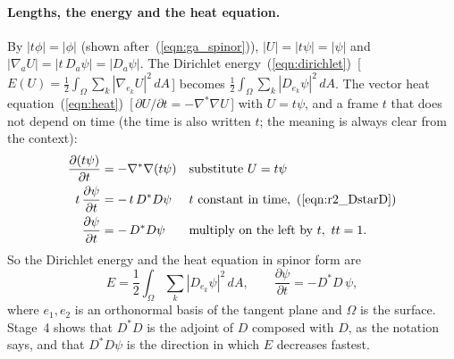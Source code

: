 \paragraph{Lengths, the energy and the heat equation.} By $|t\phi| = |\phi|$ (shown after~(\ref{eqn:ga_spinor})), $|U| = |t\psi| = |\psi|$ and $|\nabla_a U| = |t\, D_a\psi| = |D_a \psi|$. The Dirichlet energy~(\ref{eqn:dirichlet})~[\,$E(U) = \frac12\int_\Omega\sum_k|\nabla_{e_k}U|^2\,dA$\,] becomes $\frac12\int_\Omega\sum_k |D_{e_k}\psi|^2\, dA$. The vector heat equation~(\ref{eqn:heat})~[\,$\partial U/\partial t = -\nabla^*\nabla U$\,] with $U = t\psi$, and a frame $t$ that does not depend on time (the time is also written $t$; the meaning is always clear from the context):
\begin{align*}
\frac{\partial (t\psi)}{\partial t} &= -\nabla^*\nabla(t\psi) && \text{substitute } U = t\psi \\
t\,\frac{\partial\psi}{\partial t} &= -\,t\,D^*D\psi && t \text{ constant in time},\ (\ref{eqn:r2_DstarD}) \\
\frac{\partial\psi}{\partial t} &= -\,D^*D\psi && \text{multiply on the left by } t,\ tt = 1 .
\end{align*}
So the Dirichlet energy and the heat equation in spinor form are
\begin{equation}
\label{eqn:ga_energy}
E = \frac12 \int_\Omega \sum_k |D_{e_k} \psi|^2\, dA, \qquad \frac{\partial \psi}{\partial t} = -D^* D\, \psi ,
\end{equation}
where $e_1, e_2$ is an orthonormal basis of the tangent plane and $\Omega$ is the surface. Stage~4 shows that $D^*D$ is the adjoint of $D$ composed with $D$, as the notation says, and that $D^*D\psi$ is the direction in which $E$ decreases fastest.

